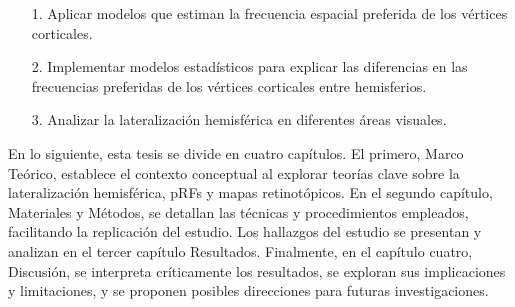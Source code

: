 \begin{itemize}	
	\item[1.]  Aplicar modelos que estiman la frecuencia espacial preferida de los v\'ertices corticales.
	
	\item[2.] Implementar modelos estadísticos para explicar las diferencias en las frecuencias preferidas de los v\'ertices corticales entre hemisferios.	
	
	\item[3.] Analizar la lateralización hemisférica en diferentes áreas visuales.
	
	
\end{itemize}

En lo siguiente, esta tesis se divide en cuatro capítulos. El primero, Marco Teórico, establece el contexto conceptual al explorar teorías clave sobre la lateralización hemisférica, pRFs y mapas retinot\'opicos. En el segundo cap\'itulo, Materiales y Métodos, se detallan las técnicas y procedimientos empleados, facilitando la replicación del estudio. Los hallazgos del estudio se presentan y analizan en el tercer cap\'itulo Resultados. Finalmente, en el capítulo cuatro, Discusión, se interpreta críticamente los resultados, se exploran sus implicaciones y limitaciones, y se proponen posibles direcciones para futuras investigaciones.


 
	




